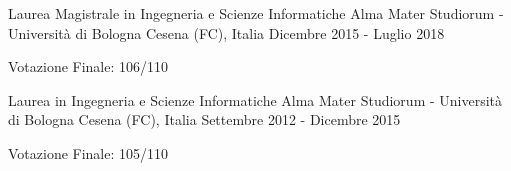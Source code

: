 

\begin{cventries}

  \cventry
    {Laurea Magistrale in Ingegneria e Scienze Informatiche} %
    {Alma Mater Studiorum - Università di Bologna} %
    {Cesena (FC), Italia} %
    {Dicembre 2015 - Luglio 2018} %
    {
      \begin{cvitems} %
        \item {Votazione Finale: 106/110}
      \end{cvitems}
    }

\cventry
{Laurea in Ingegneria e Scienze Informatiche} %
{Alma Mater Studiorum - Università di Bologna} %
{Cesena (FC), Italia} %
{Settembre 2012 - Dicembre 2015} %
{
	\begin{cvitems} %
		\item {Votazione Finale: 105/110}
	\end{cvitems}
}

\end{cventries}
